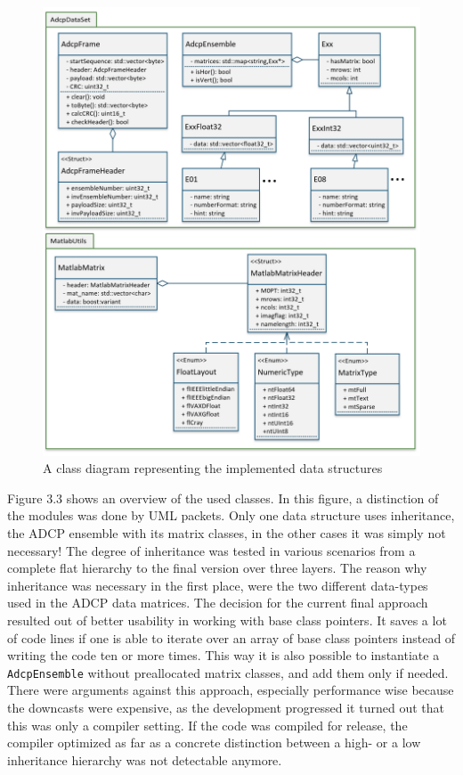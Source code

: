 \begin{figure}[h!]
\centering
      \includegraphics[width=1\textwidth]{data_structures}
        \caption{A class diagram representing the implemented data structures}
\end{figure}

Figure 3.3 shows an overview of the used classes. In this figure, a distinction of the modules was done by UML packets. Only one data structure uses inheritance, the ADCP ensemble with its matrix classes, in the other cases it was simply not necessary! The degree of inheritance was tested in various scenarios from a complete flat hierarchy to the final version over three layers. The reason why inheritance was necessary in the first place, were the two different data-types used in the ADCP data matrices. The decision for the current final approach resulted out of better usability in working with base class pointers. It saves a lot of code lines if one is able to iterate over an array of base class pointers instead of writing the code ten or more times. This way it is also possible to instantiate a \texttt{AdcpEnsemble} without preallocated matrix classes, and add them only if needed. There were arguments against this approach, especially performance wise because the downcasts were expensive, as the development progressed it turned out that this was only a compiler setting. If the code was compiled for release, the compiler optimized as far as a concrete distinction between a high- or a low inheritance hierarchy was not detectable anymore.


